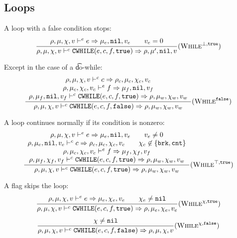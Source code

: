 \subsection{Loops}

A loop with a false condition stops:
\[\dfrac{\begin{array}{c}
    \rho,\mu,\chi,v \vdash^e e \Rightarrow \mu_e,\texttt{nil},v_e \qquad v_e = 0 \\
\end{array}}{\rho,\mu,\chi,v \vdash^c \texttt{CWHILE}(e, c, f, \texttt{true}) \Rightarrow \rho,\mu',\texttt{nil},v} (\textsc{While}^{\bot,\texttt{true}})\]

Except in the case of a \t{do-while}:
\[\dfrac{\begin{array}{c}
    \rho,\mu,\chi,v \vdash^c c \Rightarrow \rho_c,\mu_c,\chi_c,v_c \\
    \rho,\mu_c,\chi_c,v_c \vdash^e f \Rightarrow \mu_f,\texttt{nil},v_f \\
    \rho,\mu_f,\texttt{nil},v_f \vdash^c \texttt{CWHILE}(e, c, f, \texttt{true}) \Rightarrow \rho,\mu_w,\chi_w,v_w
\end{array}}{\rho,\mu,\chi,v \vdash^c \texttt{CWHILE}(e, c, f, \texttt{false}) \Rightarrow \rho,\mu_w,\chi_w,v_w} (\textsc{While}^{\texttt{false}})\]

A loop continues normally if its condition is nonzero:
\[\dfrac{\begin{array}{c}
    \rho,\mu,\chi,v \vdash^e e \Rightarrow \mu_e,\texttt{nil},v_e \qquad v_e \ne 0 \\
    \rho,\mu_e,\texttt{nil},v_e \vdash^c c \Rightarrow \rho_c,\mu_c,\chi_c,v_c \qquad \chi_c\not\in\{ \texttt{brk}, \texttt{cnt} \} \\
    \rho,\mu_c,\chi_c,v_c \vdash^e f \Rightarrow \mu_f,\chi_f,v_f \\
    \rho,\mu_f,\chi_f,v_f \vdash^c \texttt{CWHILE}(e, c, f, \texttt{true}) \Rightarrow \rho,\mu_w,\chi_w,v_w
\end{array}}{\rho,\mu,\chi,v \vdash^c \texttt{CWHILE}(e, c, f, \texttt{true}) \Rightarrow \rho,\mu_w,\chi_w,v_w} (\textsc{While}^{\top,\texttt{true}})\]

A flag skips the loop:
\[\dfrac{\begin{array}{c}
    \rho,\mu,\chi,v \vdash^e e \Rightarrow \mu_e,\chi_e,v_e \qquad \chi_e\ne\texttt{nil} \\
\end{array}}{\rho,\mu,\chi,v \vdash^c \texttt{CWHILE}(e,c,f,\texttt{true}) \Rightarrow \rho,\mu_e,\chi_e,v_e} (\textsc{While}^{\chi,\texttt{true}})\]
\[\dfrac{\begin{array}{c}
    \chi\ne\texttt{nil}
\end{array}}{\rho,\mu,\chi,v \vdash^c \texttt{CWHILE}(e,c,f,\texttt{false}) \Rightarrow \rho,\mu,\chi,v} (\textsc{While}^{\chi,\texttt{false}})\]

